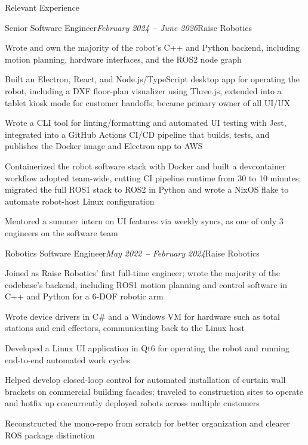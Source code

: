 \documentclass{resume}
\begin{document}
\begin{rSection}{Relevant Experience}

    \begin{rSubsection}{Senior Software Engineer}{\em February 2024 \textbf{--} June 2026}{Raise Robotics}{}
        \item Wrote and own the majority of the robot's C++ and Python backend, including motion planning, hardware interfaces, and the ROS2 node graph
        \item Built an Electron, React, and Node.js/TypeScript desktop app for operating the robot, including a DXF floor-plan visualizer using Three.js, extended into a tablet kiosk mode for customer handoffs; became primary owner of all UI/UX
        \item Wrote a CLI tool for linting/formatting and automated UI testing with Jest, integrated into a GitHub Actions CI/CD pipeline that builds, tests, and publishes the Docker image and Electron app to AWS
        \item Containerized the robot software stack with Docker and built a devcontainer workflow adopted team-wide, cutting CI pipeline runtime from 30 to 10 minutes; migrated the full ROS1 stack to ROS2 in Python and wrote a NixOS flake to automate robot-host Linux configuration
        \item Mentored a summer intern on UI features via weekly syncs, as one of only 3 engineers on the software team
    \end{rSubsection}

    \begin{rSubsection}{Robotics Software Engineer}{\em May 2022 \textbf{--} February 2024}{Raise Robotics}{}
        \item Joined as Raise Robotics' first full-time engineer; wrote the majority of the codebase's backend, including ROS1 motion planning and control software in C++ and Python for a 6-DOF robotic arm
        \item Wrote device drivers in C\# and a Windows VM for hardware such as total stations and end effectors, communicating back to the Linux host
        \item Developed a Linux UI application in Qt6 for operating the robot and running end-to-end automated work cycles
        \item Helped develop closed-loop control for automated installation of curtain wall brackets on commercial building facades; traveled to construction sites to operate and hotfix up concurrently deployed robots across multiple customers
        \item Reconstructed the mono-repo from scratch for better organization and clearer ROS package distinction
    \end{rSubsection}

\end{rSection}
\end{document}

